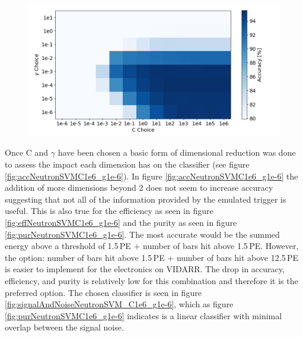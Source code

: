 \begin{figure}[!h]
\centering
\includegraphics[width=0.9\linewidth]{Chapter4/Figs/Raster/GammaCGridSearchNeutron.png}
\label{fig:GammaCGridSearchNeutron}
\end{figure}

Once C and $\gamma$ have been chosen a basic form of dimensional reduction was done to assess the impact each dimension has on the classifier (see figure \ref{fig:accNeutronSVMC1e6_g1e-6}). In figure \ref{fig:accNeutronSVMC1e6_g1e-6} the addition of more dimensions beyond 2 does not seem to increase accuracy suggesting that not all of the information provided by the emulated trigger is useful. This is also true for the efficiency as seen in figure \ref{fig:effNeutronSVMC1e6_g1e-6} and the purity as seen in figure \ref{fig:purNeutronSVMC1e6_g1e-6}. The most accurate would be the summed energy above a threshold of 1.5\,PE + number of bars hit above 1.5\,PE. However, the option: number of bars hit above 1.5\,PE + number of bars hit above 12.5\,PE is easier to implement for the electronics on VIDARR. The drop in accuracy, efficiency, and purity is relatively low for this combination and therefore it is the preferred option. The chosen classifier is seen in figure \ref{fig:signalAndNoiseNeutronSVM_C1e6_g1e-6}, which as figure \ref{fig:purNeutronSVMC1e6_g1e-6} indicates is a linear classifier with minimal overlap between the signal noise.

